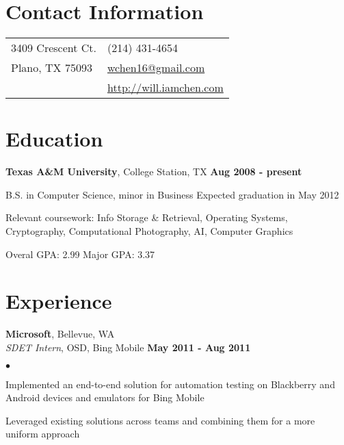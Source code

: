 \documentclass[margin,line]{res}
\newenvironment{list1}{
  \begin{list}{\ding{113}}{%
      \setlength{\itemsep}{0in}
      \setlength{\parsep}{0in} \setlength{\parskip}{0in}
      \setlength{\topsep}{0in} \setlength{\partopsep}{0in} 
      \setlength{\leftmargin}{0.17in}}}{\end{list}}
\newenvironment{list2}{
  \begin{list}{$\bullet$}{%
      \setlength{\itemsep}{0in}
      \setlength{\parsep}{0in} \setlength{\parskip}{0in}
      \setlength{\topsep}{0in} \setlength{\partopsep}{0in} 
      \setlength{\leftmargin}{0.18in}}}{\end{list}}
\begin{document}

\begin{resume}
\section{\sc Contact Information}
\vspace{.05in}
\begin{tabular}{@{}p{3in}p{4in}}
3409 Crescent Ct.          & (214) 431-4654 \\
Plano, TX 75093            & \href{mailto:wchen16@gmail.com}{wchen16@gmail.com} \\
                           & \href{http://will.iamchen.com}{http://will.iamchen.com} \\
\end{tabular}

%
%
\section{\sc Education}
{\bf Texas A\&M University}, College Station, TX \hfill {\bf Aug 2008 - present} \\
\vspace*{-3mm}
\begin{list1}
\item[] \hspace*{-5mm} B.S. in Computer Science, minor in Business \hfill Expected graduation in May 2012 
\item[] \hspace*{-5mm} Relevant coursework: Info Storage \& Retrieval, Operating Systems,
 Cryptography, Computational Photography, AI, Computer Graphics
\item[] \hspace*{-5mm} Overal GPA: 2.99 \hspace{5mm} Major GPA: 3.37
\end{list1}


%
%
\section{\sc Experience}
{\bf Microsoft}, Bellevue, WA \\
{\em SDET Intern}, OSD, Bing Mobile \hfill {\bf May 2011 - Aug 2011} \\
\vspace{-3mm}
\begin{list2}
\item Implemented an end-to-end solution for automation testing on Blackberry and Android devices 
  and emulators for Bing Mobile
\item Leveraged existing solutions across teams and combining them for a more uniform approach
\end{list2}


\end{resume}
\end{document}
